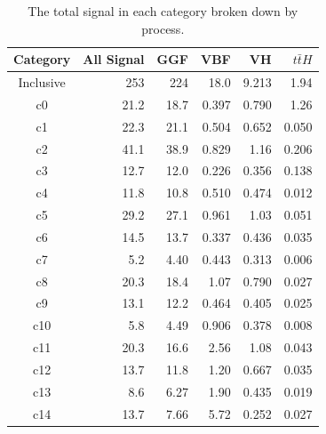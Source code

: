 \begin{table}[htb]
    \caption{The total signal in each category broken down by process.}
  \begin{center}
    \begin{tabular}{crrrrr}
     \hline
      Category     & All Signal &     GGF     &     VBF      &    VH       & $t\bar{t}H$ \\  %
      \hline
      Inclusive    &    253     &     224     &     18.0     &    9.213    &    1.94      \\
      c0           &    21.2    &     18.7    &     0.397    &    0.790    &    1.26      \\ 
      c1           &    22.3    &     21.1    &     0.504    &    0.652    &    0.050     \\ 
      c2           &    41.1    &     38.9    &     0.829    &    1.16     &    0.206     \\ 
      c3           &    12.7    &     12.0    &     0.226    &    0.356    &    0.138     \\ 
      c4           &    11.8    &     10.8    &     0.510    &    0.474    &    0.012     \\ 
      c5           &    29.2    &     27.1    &     0.961    &    1.03     &    0.051     \\ 
      c6           &    14.5    &     13.7    &     0.337    &    0.436    &    0.035     \\ 
      c7           &    5.2     &     4.40    &     0.443    &    0.313    &    0.006     \\ 
      c8           &    20.3    &     18.4    &     1.07     &    0.790    &    0.027     \\ 
      c9           &    13.1    &     12.2    &     0.464    &    0.405    &    0.025     \\ 
      c10          &    5.8     &     4.49    &     0.906    &    0.378    &    0.008     \\ 
      c11          &    20.3    &     16.6    &     2.56     &    1.08     &    0.043     \\ 
      c12          &    13.7    &     11.8    &     1.20     &    0.667    &    0.035     \\ 
      c13          &    8.6     &     6.27    &     1.90     &    0.435    &    0.019     \\ 
      c14          &    13.7    &     7.66    &     5.72     &    0.252    &    0.027     \\ 
      \hline
    \end{tabular}
  \end{center}
  \label{tab:sig_yields_table}
\end{table}

